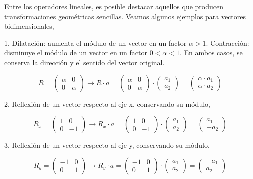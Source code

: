 \begin{paracol}{2}
Entre los operadores lineales, es posible destacar aquellos que producen transformaciones geométricas sencillas. Veamos algunos ejemplos para vectores bidimensionales,

1. Dilatación: aumenta el módulo de un vector en un factor $\alpha>1$. Contracción: disminuye el módulo de un vector en un factor $0<\alpha<1$. En ambos casos, se conserva la dirección y el sentido del vector original.
\end{paracol} 
\begin{equation*}
R=\begin{pmatrix}
\alpha& 0\\
0& \alpha
\end{pmatrix} \rightarrow R\cdot a = \begin{pmatrix}
\alpha& 0\\
0& \alpha
\end{pmatrix} \cdot \begin{pmatrix}
a_1\\
a_2
\end{pmatrix}= \begin{pmatrix}
\alpha \cdot a_1\\
\alpha \cdot a_2
\end{pmatrix}
\end{equation*}
\begin{paracol}{2}
2. Reflexión de un vector respecto al eje x, conservando su módulo,
\end{paracol}
\begin{equation*}
R_x=\begin{pmatrix}
1& 0\\
0& -1
\end{pmatrix} \rightarrow R_x\cdot a = \begin{pmatrix}
1& 0\\
0& -1
\end{pmatrix} \cdot \begin{pmatrix}
a_1\\
a_2
\end{pmatrix}= \begin{pmatrix}
a_1\\
-a_2
\end{pmatrix}
\end{equation*}
\begin{paracol}{2}
3. Reflexión de un vector respecto al eje y, conservando su módulo,
\end{paracol}
\begin{equation*}
R_y=\begin{pmatrix}
-1& 0\\
0& 1
\end{pmatrix} \rightarrow R_y\cdot a = \begin{pmatrix}
-1& 0\\
0& 1
\end{pmatrix} \cdot \begin{pmatrix}
a_1\\
a_2
\end{pmatrix}= \begin{pmatrix}
-a_1\\
a_2
\end{pmatrix}
\end{equation*}
